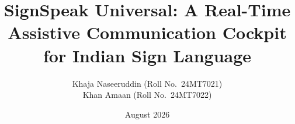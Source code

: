 \clearpage
{}

\title{\LARGE SignSpeak Universal: A Real-Time Assistive Communication Cockpit for Indian Sign Language}
\author{Khaja Naseeruddin (Roll No.~24MT7021) \\ Khan Amaan (Roll No.~24MT7022)}
\date{August 2026}

\hypersetup{pageanchor=false}
\maketitle
\hypersetup{pageanchor=true}

